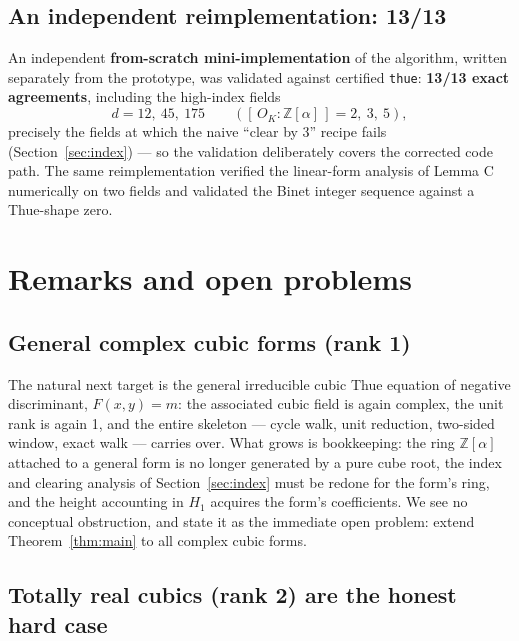 \documentclass[11pt]{amsart}
\theoremstyle{plain}
\theoremstyle{remark}
\begin{document}
\subsection{An independent reimplementation: 13/13}
\label{sec:reimpl}

An independent \textbf{from-scratch mini-implementation} of the
algorithm, written separately from the prototype, was validated
against certified \texttt{thue}: \textbf{13/13 exact agreements},
including the high-index fields
\[
d = 12,\ 45,\ 175 \qquad
([\,O_K : \mathbb{Z}[\alpha]\,] = 2,\ 3,\ 5),
\]
precisely the fields at which the naive ``clear by 3'' recipe fails
(Section~\ref{sec:index}) --- so the validation deliberately covers
the corrected code path. The same reimplementation verified the
linear-form analysis of Lemma C numerically on two fields and
validated the Binet integer sequence against a Thue-shape zero.

\section{Remarks and open problems}\label{sec:remarks}

\subsection{General complex cubic forms (rank 1)}\label{rem:general}

The natural next target is the general irreducible cubic Thue
equation of negative discriminant, $F(x, y) = m$: the associated
cubic field is again complex, the unit rank is again 1, and the
entire skeleton --- cycle walk, unit reduction, two-sided window,
exact walk --- carries over. What grows is bookkeeping: the ring
$\mathbb{Z}[\alpha]$ attached to a general form is no longer
generated by a pure cube root, the index and clearing analysis of
Section~\ref{sec:index} must be redone for the form's ring, and the
height accounting in $H_1$ acquires the form's coefficients. We see
no conceptual obstruction, and state it as the immediate open
problem: extend Theorem~\ref{thm:main} to all complex cubic forms.

\subsection{Totally real cubics (rank 2) are the honest hard case}
\label{rem:totallyreal}
\end{document}
